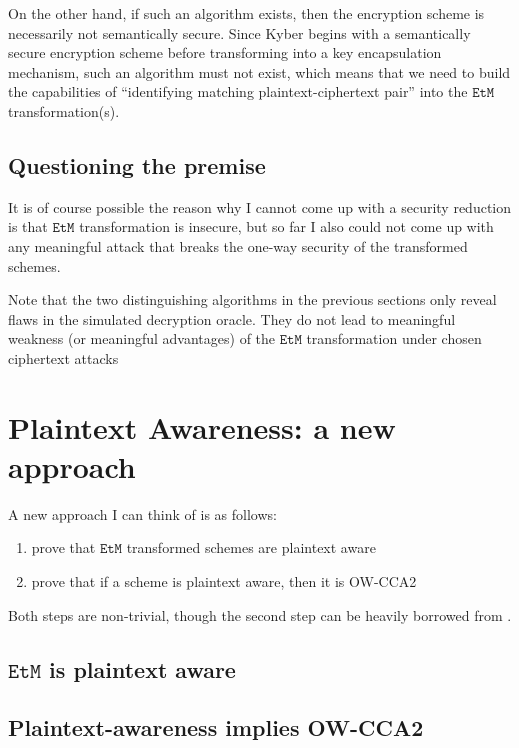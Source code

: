 \documentclass{article}
\newcommand{\monospace}{\texttt}
\newcommand{\etm}{\monospace{EtM}}  %
\begin{document}
On the other hand, if such an algorithm exists, then the encryption scheme is necessarily not semantically secure. Since Kyber begins with a semantically secure encryption scheme before transforming into a key encapsulation mechanism, such an algorithm must not exist, which means that we need to build the capabilities of ``identifying matching plaintext-ciphertext pair'' into the $\etm$ transformation(s).

\subsection{Questioning the premise}
It is of course possible the reason why I cannot come up with a security reduction is that $\etm$ transformation is insecure, but so far I also could not come up with any meaningful attack that breaks the one-way security of the transformed schemes.

Note that the two distinguishing algorithms in the previous sections only reveal flaws in the simulated decryption oracle. They do not lead to meaningful weakness (or meaningful advantages) of the $\etm$ transformation under chosen ciphertext attacks

\section{Plaintext Awareness: a new approach}
A new approach I can think of is as follows:

\begin{enumerate}
    \item prove that $\etm$ transformed schemes are plaintext aware
    \item prove that if a scheme is plaintext aware, then it is OW-CCA2
\end{enumerate}

Both steps are non-trivial, though the second step can be heavily borrowed from \cite{bellare1998relations}.

\subsection{$\etm$ is plaintext aware}

\subsection{Plaintext-awareness implies OW-CCA2}



\end{document}
